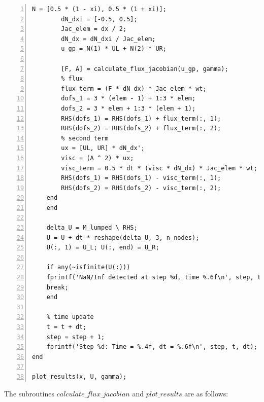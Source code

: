 \documentclass[12pt, oneside]{article}
\begin{document}
\begin{lstlisting}[frame=single, numbers=left, style=Matlab-editor]
	    N = [0.5 * (1 - xi), 0.5 * (1 + xi)];
	    dN_dxi = [-0.5, 0.5];
	    Jac_elem = dx / 2;
	    dN_dx = dN_dxi / Jac_elem;
	    u_gp = N(1) * UL + N(2) * UR;
	    
	    [F, A] = calculate_flux_jacobian(u_gp, gamma);
	    % flux
	    flux_term = (F * dN_dx) * Jac_elem * wt;
	    dofs_1 = 3 * (elem - 1) + 1:3 * elem;
	    dofs_2 = 3 * elem + 1:3 * (elem + 1);
	    RHS(dofs_1) = RHS(dofs_1) + flux_term(:, 1);
	    RHS(dofs_2) = RHS(dofs_2) + flux_term(:, 2);
	    % second term
	    ux = [UL, UR] * dN_dx';
	    visc = (A ^ 2) * ux;
	    visc_term = 0.5 * dt * (visc * dN_dx) * Jac_elem * wt;
	    RHS(dofs_1) = RHS(dofs_1) - visc_term(:, 1);
	    RHS(dofs_2) = RHS(dofs_2) - visc_term(:, 2);
	end
    end
    
    delta_U = M_lumped \ RHS;
    U = U + dt * reshape(delta_U, 3, n_nodes);
    U(:, 1) = U_L; U(:, end) = U_R;
    
    if any(~isfinite(U(:)))
	fprintf('NaN/Inf detected at step %d, time %.6f\n', step, t);
	break;
    end
    
    % time update
    t = t + dt;
    step = step + 1;
    fprintf('Step %d: Time = %.4f, dt = %.6f\n', step, t, dt);
end

plot_results(x, U, gamma);

\end{lstlisting}
The subroutines $calculate\_flux\_jacobian$ and $plot\_results$ are as follows:
\end{document}
